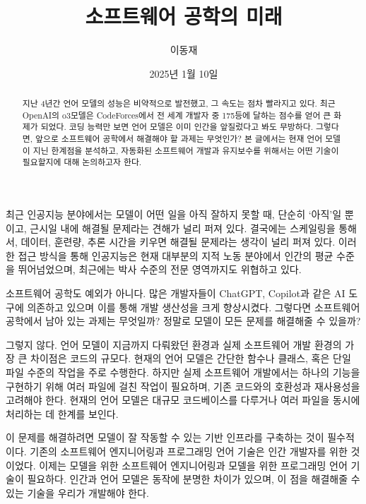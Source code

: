 \documentclass[11pt, oneside]{article}   	%
\title{소프트웨어 공학의 미래}
\author{이동재}
\date{2025년 1월 10일}
\begin{document}
\maketitle


\begin{abstract}
  지난 4년간 언어 모델의 성능은 비약적으로 발전했고, 그 속도는 점차 빨라지고 있다. 최근 OpenAI의 o3모델은 CodeForces에서 전 세계 개발자 중 175등에 달하는 점수를 얻어 큰 화제가 되었다.
  코딩 능력만 보면 언어 모델은 이미 인간을 앞질렀다고 봐도 무방하다. 그렇다면, 앞으로 소프트웨어 공학에서 해결해야 할 과제는 무엇인가?
  본 글에서는 현재 언어 모델이 지닌 한계점을 분석하고, 자동화된 소프트웨어 개발과 유지보수를 위해서는 어떤 기술이 필요할지에 대해 논의하고자 한다.
\end{abstract}
  최근 인공지능 분야에서는 모델이 어떤 일을 아직 잘하지 못할 때, 단순히 `아직'일 뿐이고, 근시일 내에 해결될 문제라는 견해가 널리 퍼져 있다. 
  결국에는 스케일링을 통해서, 데이터, 훈련량, 추론 시간을 키우면 해결될 문제라는 생각이 널리 퍼져 있다.
  이러한 접근 방식을 통해 인공지능은 현재 대부분의 지적 노동 분야에서 인간의 평균 수준을 뛰어넘었으며, 최근에는 박사 수준의 전문 영역까지도 위협하고 있다.

  소프트웨어 공학도 예외가 아니다. 많은 개발자들이 ChatGPT, Copilot과 같은 AI 도구에 의존하고 있으며
  이를 통해 개발 생산성을 크게 향상시켰다. 그렇다면 소프트웨어 공학에서 남아 있는 과제는 무엇일까? 정말로 모델이 모든 문제를 해결해줄 수 있을까?

  그렇지 않다. 언어 모델이 지금까지 다뤄왔던 환경과 실제 소프트웨어 개발 환경의 가장 큰 차이점은 코드의 규모다.
  현재의 언어 모델은 간단한 함수나 클래스, 혹은 단일 파일 수준의 작업을 주로 수행한다.
  하지만 실제 소프트웨어 개발에서는 하나의 기능을 구현하기 위해 여러 파일에 걸친 작업이 필요하며, 기존 코드와의 호환성과 재사용성을 고려해야 한다.
  현재의 언어 모델은 대규모 코드베이스를 다루거나 여러 파일을 동시에 처리하는 데 한계를 보인다.

  이 문제를 해결하려면 모델이 잘 작동할 수 있는 기반 인프라를 구축하는 것이 필수적이다.
  기존의 소프트웨어 엔지니어링과 프로그래밍 언어 기술은 인간 개발자를 위한 것이었다.
  이제는 모델을 위한 소프트웨어 엔지니어링과 모델을 위한 프로그래밍 언어 기술이 필요하다.
  인간과 언어 모델은 동작에 분명한 차이가 있으며, 이 점을 해결해줄 수 있는 기술을 우리가 개발해야 한다.
\end{document}
